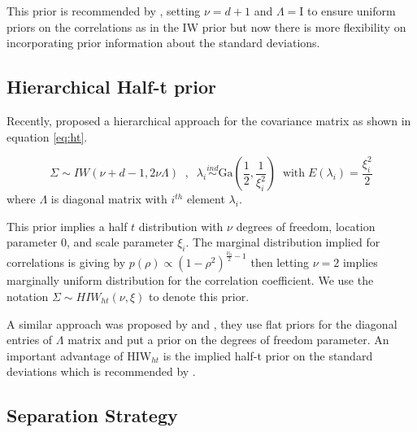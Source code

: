 \documentclass[12pt]{article}
\newcommand{\nacho}[1]{\textcolor{blue}{(nacho: #1)}}
\newcommand{\I}{\mathrm{I}}
\begin{document}
This prior is recommended by \cite{gelmanhill}, setting $\nu=d+1$ and $\Lambda=\I$ to ensure uniform priors on the correlations as in the IW prior but now there is more flexibility on incorporating prior information about the standard deviations. %

\subsection{Hierarchical Half-t prior}

Recently, \cite{huang2013simple} proposed a hierarchical approach for the covariance matrix as shown in equation \eqref{eq:ht}. 

\begin{equation}
\Sigma \sim IW( \nu + d - 1 ,  2\nu\Lambda) \;\;,\;\;  \lambda_i  \stackrel{ind} \sim \mbox{Ga}\left(\frac{1}{2} , \frac{1}{\xi_i^2}\right) \;\; \mbox{with} \; E(\lambda_i)=\frac{\xi_i^2}{2} 
\label{eq:ht}
\end{equation} 
where $\Lambda$ is diagonal matrix with $i^{th}$ element $\lambda_i$. 

This prior implies a half $t$ distribution with $\nu$ degrees of freedom, location parameter 0, and scale parameter $\xi_i$.  The marginal distribution implied for correlations is giving by $p(\rho) \propto (1-\rho^2)^{\frac{\nu_0}{2}-1}$ then letting $\nu=2$ implies marginally uniform distribution for the correlation coefficient. We use the notation $\Sigma \sim HIW_{ht}(\nu, \xi)$ to denote this prior.

A similar approach was proposed by \cite{daniels1999} and \cite{matilde}, they use flat priors for the diagonal entries of $\Lambda$ matrix and put a prior on the degrees of freedom parameter.  An important advantage of  HIW$_{ht}$ is the implied half-t prior on the standard deviations which is recommended by \cite{gelman2006prior}.

\subsection{Separation Strategy \label{sec:ss} }
\end{document}
